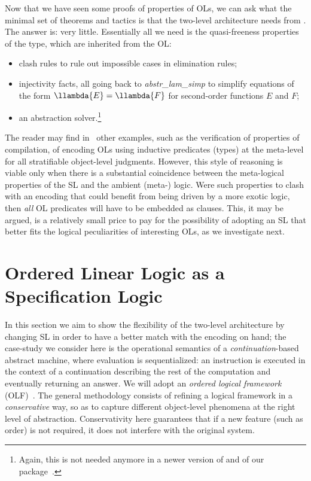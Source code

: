 \documentclass[final]{svjour3}
\begin{document}
Now that we have seen some proofs of properties of OLs, we
can ask what the minimal set of theorems and tactics is that the
two-level architecture needs from \hybrid.  The answer is: very little.
Essentially all we need is the quasi-freeness properties of the
\hybrid type, which are inherited from the OL:
\begin{itemize}
\item clash rules to rule out impossible cases in elimination rules;
\item injectivity facts, all going back to \emph{abstr\_lam\_simp} to simplify
  equations of the form $\llambda{E}=\llambda{F}$ for
  second-order functions $E$ and $F$;
\item an abstraction solver.\footnote{Again, this is not needed anymore
  in a newer version of \HOL and of our package~\cite{MMF07}.} 
\end{itemize}


The reader may find in~\cite{Momigliano03fos} other examples, such as
the verification of properties of compilation, of encoding OLs
using inductive predicates (types) at the meta-level for all
stratifiable object-level judgments.  However, this style of reasoning
is viable only when there is a substantial coincidence between the
meta-logical properties of the SL and the ambient (meta-) logic.  Were such
properties to clash with an encoding that could benefit from being
driven by a more exotic logic, then \emph{all} OL predicates will have
to be embedded as  clauses. This, it may be argued, is a
relatively small price to pay for the possibility of adopting an SL
that better fits the logical peculiarities of 
interesting OLs, as we investigate next.




\section{Ordered Linear Logic as a Specification Logic}
\label{sec:olli}
\renewcommand{\coln}{\mid} 
\renewcommand{\sbc}[3]{#1 \If #2 \coln #3}
\renewcommand{\elist}{[ \ ]} 

In this section we aim to show the flexibility of the two-level
architecture by changing SL in order to have a better match with the
encoding on hand; the case-study we consider here is the operational
semantics of a \emph{continuation}-based abstract machine, where evaluation is
sequentialized: an instruction is executed in the context of a
{continuation} describing the rest of the computation and eventually
returning an {answer}.  We will adopt an \emph{ordered logical
  framework} (OLF)~\cite{Polakow01phd}. The general methodology
consists of refining a logical framework in a \emph{conservative} way,
so as to capture different object-level phenomena at the right level
of abstraction. Conservativity here guarantees that if a new feature
(such as order) is not required, it does not interfere with the
original system.
\end{document}
